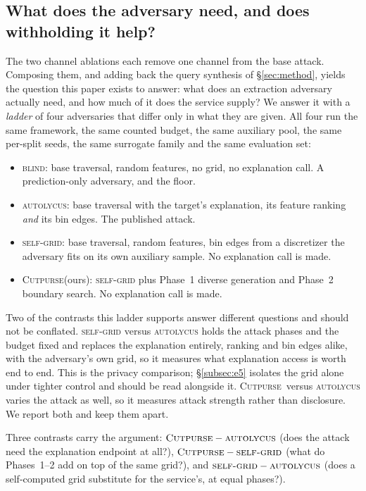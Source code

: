 \documentclass[sigconf,anonymous,review]{acmart}
\newcommand{\sys}{\textsc{Cutpurse}}
\begin{document}
\subsection{What does the adversary need, and does withholding it help?}
\label{subsec:ladder}
The two channel ablations each remove one channel from the base attack. Composing them, and adding back the query
synthesis of \S\ref{sec:method}, yields the question this paper exists to answer: what does an
extraction adversary actually need, and how much of it does the service supply? We answer it with a
\emph{ladder} of four adversaries that differ only in what they are given. All four run the same
framework, the same counted budget, the same auxiliary pool, the same per-split seeds, the same
surrogate family and the same evaluation set:

\begin{itemize}
  \item \textsc{blind}: base traversal, random features, no grid, no explanation call. A
  prediction-only adversary, and the floor.
  \item \textsc{autolycus}: base traversal with the target's explanation, its feature ranking \emph{and} its bin edges. The published attack.
  \item \textsc{self-grid}: base traversal, random features, bin edges from a discretizer the
  adversary fits on its own auxiliary sample. No explanation call is made.
  \item \sys (ours): \textsc{self-grid} plus Phase~1 diverse generation and
  Phase~2 boundary search. No explanation call is made.
\end{itemize}

Two of the contrasts this ladder supports answer different questions and should not be conflated.
\textsc{self-grid} versus \textsc{autolycus} holds the attack phases and the budget fixed and
replaces the explanation entirely, ranking and bin edges alike, with the adversary's own grid, so it
measures what explanation access is worth end to end. This is the privacy comparison;
\S\ref{subsec:e5} isolates the grid alone under tighter control and should be read alongside it. \sys\
versus \textsc{autolycus} varies the attack as well, so it measures attack strength rather than
disclosure. We report both and keep them apart.

Three contrasts carry the argument:
$\sys-\textsc{autolycus}$ (does the attack need the explanation endpoint at all?),
$\sys-\textsc{self-grid}$ (what do Phases~1--2 add on top of the same grid?), and
$\textsc{self-grid}-\textsc{autolycus}$ (does a self-computed grid substitute for the service's, at
equal phases?).
\end{document}
